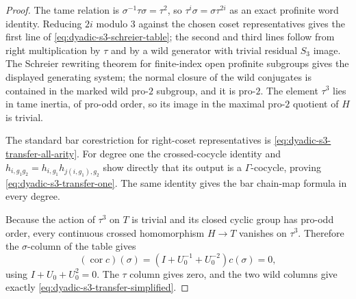 \documentclass[11pt]{article}
\theoremstyle{definition}
\begin{document}
\begin{proof}
The tame relation is
$\sigma^{-1}\tau\sigma=\tau^2$,
so $\tau^i\sigma=\sigma\tau^{2i}$
as an exact profinite word identity.
Reducing $2i$ modulo $3$ against
the chosen coset representatives
gives the first line of
\eqref{eq:dyadic-s3-schreier-table};
the second and third lines follow
from right multiplication by
$\tau$ and by a wild generator
with trivial residual $S_3$ image.
The Schreier rewriting theorem for
finite-index open profinite subgroups
gives the displayed generating
system; the normal closure of the
wild conjugates is contained in
the marked wild pro-$2$ subgroup,
and it is pro-$2$.
The element $\tau^3$ lies in tame
inertia, of pro-odd order, so its
image in the maximal pro-$2$
quotient of $H$ is trivial.

The standard bar corestriction for
right-coset representatives is
\eqref{eq:dyadic-s3-transfer-all-arity}.
For degree one the crossed-cocycle
identity and
$h_{i,g_1g_2}=
h_{i,g_1}h_{j(i,g_1),g_2}$
show directly that its output is
a $\Gamma$-cocycle, proving
\eqref{eq:dyadic-s3-transfer-one}.
The same identity gives the bar
chain-map formula in every degree.

Because the action of $\tau^3$
on $T$ is trivial and its closed
cyclic group has pro-odd order,
every continuous crossed
homomorphism $H\to T$ vanishes on
$\tau^3$.  Therefore the
$\sigma$-column of the table gives
\[
(\operatorname{cor}c)(\sigma)
=(I+U_0^{-1}+U_0^{-2})c(\sigma)=0,
\]
using $I+U_0+U_0^2=0$.
The $\tau$ column gives zero, and
the two wild columns give exactly
\eqref{eq:dyadic-s3-transfer-simplified}.
\end{proof}
\end{document}

